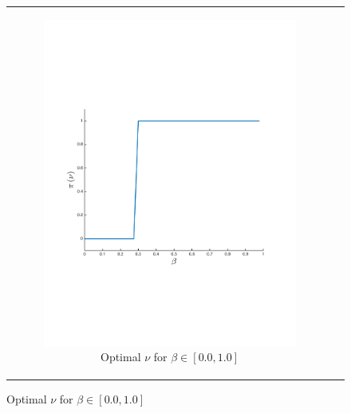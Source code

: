 {\begin{figure}[ht]
\begin{tabular}{cc}
            \begin{subfigure}{0.2\textwidth}\centering\includegraphics[width=\textwidth]{images/sir_opt_new}\caption{Optimal {\footnotesize $ \nu $} for {\footnotesize $ \beta \in \left[ 0.0, 1.0 \right] $}}\label{fig:sir_opt}\end{subfigure}
            \\

\end{tabular}
\end{figure}}
